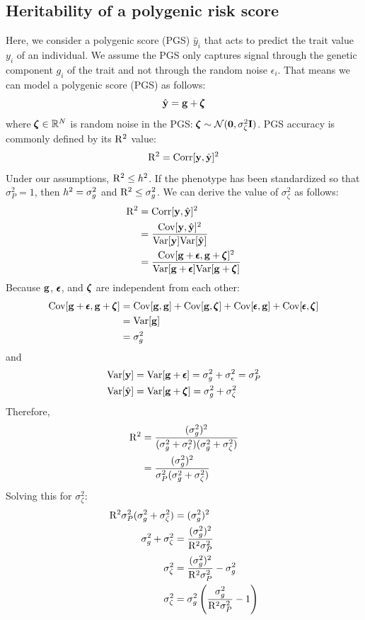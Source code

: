 \documentclass[12pt]{article}
\begin{document}
\subsection{Heritability of a polygenic risk score}
Here, we consider a polygenic score (PGS) $\hat{y}_i$ that acts to predict the trait value $y_i$ of an individual.
We assume the PGS only captures signal through the genetic component $g_i$ of the trait and not through the random noise $\epsilon_i$.
That means we can model a polygenic score (PGS) as follows:
$$ \hat{\mathbf{y}} = \mathbf{g} + \pmb{\zeta} $$
where $\pmb{\zeta} \in \mathbb{R}^N$ is random noise in the PGS: $\pmb{\zeta} \sim \mathcal{N}(\textbf{0},\sigma^2_\zeta \mathbf{I})$.
PGS accuracy is commonly defined by its $\mathrm{R}^2$ value:
$$ \mathrm{R}^2 = \mathrm{Corr}[\mathbf{y}, \hat{\mathbf{y}}]^2 $$
Under our assumptions, $\mathrm{R}^2 \leq h^2$.
If the phenotype has been standardized so that $\sigma_P^2 = 1$, then $h^2 = \sigma_g^2$ and $\mathrm{R}^2 \leq \sigma_g^2$.
We can derive the value of $\sigma^2_\zeta$ as follows:
\begin{align*}
    \mathrm{R}^2 &= \mathrm{Corr}[\mathbf{y}, \hat{\mathbf{y}}]^2 \\
    &= \frac{ \mathrm{Cov}[\mathbf{y}, \hat{\mathbf{y}}]^2 }{ \mathrm{Var}[\mathbf{y}] \mathrm{Var}[\hat{\mathbf{y}}] } \\
    &= \frac{ \mathrm{Cov}[\mathbf{g} + \pmb{\epsilon}, \mathbf{g} + \pmb{\zeta}]^2 }{ \mathrm{Var}[\mathbf{g} + \pmb{\epsilon}] \mathrm{Var}[\mathbf{g} + \pmb{\zeta}] }
\end{align*}
Because $\mathbf{g}$, $\pmb{\epsilon}$, and $\pmb{\zeta}$ are independent from each other:
\begin{align*}
    \mathrm{Cov}[\mathbf{g} + \pmb{\epsilon}, \mathbf{g} + \pmb{\zeta}]
    &= \mathrm{Cov}[\mathbf{g}, \mathbf{g}] + \mathrm{Cov}[\mathbf{g}, \pmb{\zeta}] + \mathrm{Cov}[\pmb{\epsilon}, \mathbf{g}] + \mathrm{Cov}[\pmb{\epsilon}, \pmb{\zeta}] \\
    &= \mathrm{Var}[\mathbf{g}] \\
    &= \sigma_g^2
\end{align*}
and
\begin{align*}
    \mathrm{Var}[\mathbf{y}] &= \mathrm{Var}[\mathbf{g} + \pmb{\epsilon}] = \sigma_g^2 + \sigma_{\epsilon}^2 = \sigma_P^2 \\
    \mathrm{Var}[\hat{\mathbf{y}}] &= \mathrm{Var}[\mathbf{g} + \pmb{\zeta}] = \sigma_g^2 + \sigma_\zeta^2
\end{align*}
Therefore,
\begin{align*}
    \mathrm{R}^2
    &= \frac{(\sigma_g^2)^2}{(\sigma_g^2 + \sigma_{\epsilon}^2)(\sigma_g^2 + \sigma_\zeta^2)} \\
    &= \frac{(\sigma_g^2)^2}{\sigma_P^2(\sigma_g^2 + \sigma_\zeta^2)}
\end{align*}
Solving this for $\sigma_\zeta^2$:
\begin{align*}
    \mathrm{R}^2 \sigma_P^2(\sigma_g^2 + \sigma_\zeta^2) &= (\sigma_g^2)^2 \\
    \sigma_g^2 + \sigma_\zeta^2 &= \frac{(\sigma_g^2)^2}{\mathrm{R}^2 \sigma_P^2} \\
    \sigma_\zeta^2 &= \frac{(\sigma_g^2)^2}{\mathrm{R}^2 \sigma_P^2} - \sigma_g^2 \\
    \sigma_\zeta^2 &= \sigma_g^2 \left(\frac{\sigma_g^2}{\mathrm{R}^2 \sigma_P^2} - 1 \right)
\end{align*}
\end{document}
